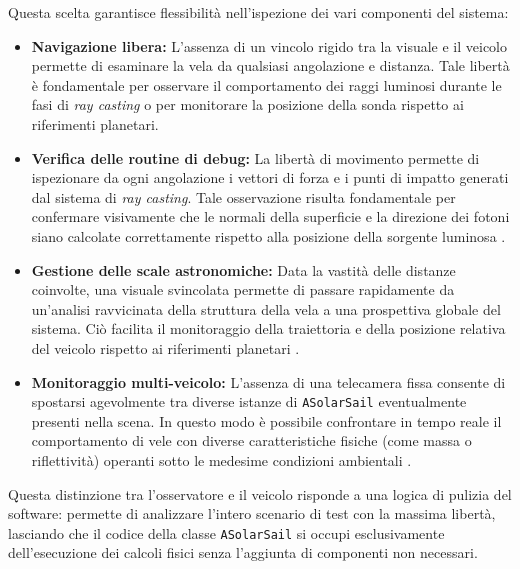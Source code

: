 Questa scelta garantisce flessibilità nell'ispezione dei vari componenti del sistema:

\begin{itemize}
\item \textbf{Navigazione libera:} L'assenza di un vincolo rigido tra la visuale e il veicolo permette di esaminare la vela da qualsiasi angolazione e distanza. Tale libertà è fondamentale per osservare il comportamento dei raggi luminosi durante le fasi di \textit{ray casting} o per monitorare la posizione della sonda rispetto ai riferimenti planetari.
\item \textbf{Verifica delle routine di debug:} La libertà di movimento permette di ispezionare da ogni angolazione i vettori di forza e i punti di impatto generati dal sistema di \textit{ray casting}. Tale osservazione risulta fondamentale per confermare visivamente che le normali della superficie e la direzione dei fotoni siano calcolate correttamente rispetto alla posizione della sorgente luminosa \cite{ericson2004real}.
\item \textbf{Gestione delle scale astronomiche:} Data la vastità delle distanze coinvolte, una visuale svincolata permette di passare rapidamente da un'analisi ravvicinata della struttura della vela a una prospettiva globale del sistema. Ciò facilita il monitoraggio della traiettoria e della posizione relativa del veicolo rispetto ai riferimenti planetari \cite{curtis2005orbital}.
\item \textbf{Monitoraggio multi-veicolo:} L'assenza di una telecamera fissa consente di spostarsi agevolmente tra diverse istanze di \lstinline|ASolarSail| eventualmente presenti nella scena. In questo modo è possibile confrontare in tempo reale il comportamento di vele con diverse caratteristiche fisiche (come massa o riflettività) operanti sotto le medesime condizioni ambientali \cite{rodrigues2023review, simo2016realistic}.
\end{itemize}

Questa distinzione tra l'osservatore e il veicolo risponde a una logica di pulizia del software: permette di analizzare l'intero scenario di test con la massima libertà, lasciando che il codice della classe \lstinline|ASolarSail| si occupi esclusivamente dell'esecuzione dei calcoli fisici senza l'aggiunta di componenti non necessari.


